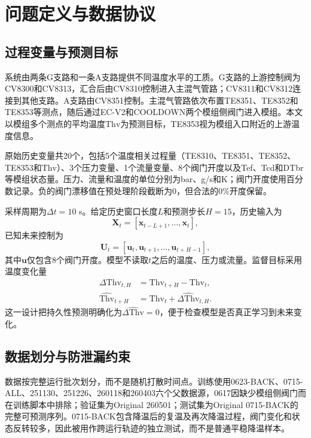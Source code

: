 \documentclass[a4paper,fleqn]{cas-dc}
\newcommand{\Thv}{\mathrm{Thv}}
\newcommand{\vect}[1]{\boldsymbol{#1}}
\begin{document}
\section{问题定义与数据协议}\label{sec:data}

\subsection{过程变量与预测目标}

系统由两条G支路和一条A支路提供不同温度水平的工质。G支路的上游控制阀为CV8300和CV8313，汇合后由CV8310控制进入主混气管路；CV8311和CV8312连接到其他支路。A支路由CV8351控制。主混气管路依次布置TE8351、TE8352和TE8353等测点，随后通过EC-V2和COOLDOWN两个模组侧阀门进入模组。本文以模组多个测点的平均温度$\Thv$为预测目标，TE8353视为模组入口附近的上游温度信息。

原始历史变量共20个，包括5个温度相关过程量（TE8310、TE8351、TE8352、TE8353和$\Thv$）、3个压力变量、1个流量变量、8个阀门开度以及Tef、Tcd和DTbr等模组状态量。压力、流量和温度的单位分别为bar、g/s和K；阀门开度使用百分数记录。负的阀门漂移值在预处理阶段截断为0，但合法的0\%开度保留。

采样周期为$\Delta t=10$ s。给定历史窗口长度$L$和预测步长$H=15$，历史输入为
\begin{equation}
\vect X_t=[\vect x_{t-L+1},\ldots,\vect x_t],
\end{equation}
已知未来控制为
\begin{equation}
\vect U_t=[\vect u_t,\vect u_{t+1},\ldots,\vect u_{t+H-1}],
\end{equation}
其中$\vect u$仅包含8个阀门开度。模型不读取$t$之后的温度、压力或流量。监督目标采用温度变化量
\begin{equation}
\begin{aligned}
\Delta \Thv_{t,H}&=\Thv_{t+H}-\Thv_t,\\
\widehat{\Thv}_{t+H}&=\Thv_t+\widehat{\Delta \Thv}_{t,H}.
\end{aligned}
\label{eq:delta}
\end{equation}
这一设计把持久性预测明确化为$\widehat{\Delta \Thv}=0$，便于检查模型是否真正学习到未来变化。

\subsection{数据划分与防泄漏约束}

数据按完整运行批次划分，而不是随机打散时间点。训练使用0623-BACK、0715-ALL、251130、251226、260118和260403六个父数据源，0617因缺少模组侧阀门而在训练脚本中排除；验证集为Original 260501；测试集为Original 0715-BACK的完整可预测序列。0715-BACK包含降温后的复温及再次降温过程，阀门变化和状态反转较多，因此被用作跨运行轨迹的独立测试，而不是普通平稳降温样本。
\end{document}
